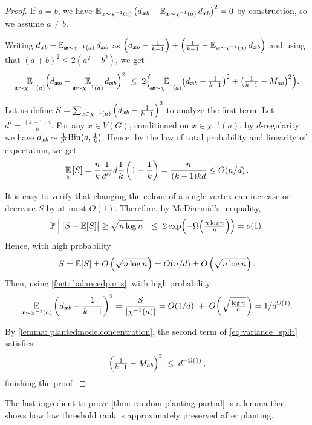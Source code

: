 \begin{proof}
    If $a=b$, we have $\operatorname*{\mathbb{E}}_{\bm{x} \sim \chi^{-1}(a)} \left(d_{\bm{x}b} - \operatorname*{\mathbb{E}}_{\bm{x} \sim \chi^{-1}(a)} d_{\bm{x}b}\right)^2 = 0$ by construction, so we assume $a\neq b$.
    
    Writing $d_{\bm{x}b} - \operatorname*{\mathbb{E}}_{\bm{x} \sim \chi^{-1}(a)} d_{\bm{x}b}$ as $\left(d_{\bm{x}b} - \frac1{k-1}\right) + \left(\frac1{k-1} - \operatorname*{\mathbb{E}}_{\bm{x} \sim \chi^{-1}(a)} d_{\bm{x}b}\right)$ and using that $(a+b)^2\leq 2(a^2+b^2)$, we get
    \begin{equation}\label{eq:variance_split}
        \E_{\bm{x} \sim \chi^{-1}(a)} \Bigl(\D{\bm{x}}{b} - \E_{\bm{x} \sim \chi^{-1}(a)} \D{\bm{x}}{b}\Bigr)^2
        \;\le\;
        2\Bigl(\E_{\bm{x} \sim \chi^{-1}(a)} \bigl(\D{\bm{x}}{b} - \tfrac1{k-1}\bigr)^2
        +\bigl(\tfrac1{k-1}-M_{ab}\bigr)^2\Bigr).
    \end{equation}

    Let us define $S=\sum_{x \in \chi^{-1}(a)} \left(d_{xb} - \frac1{k-1}\right)^2$ to analyze the first term. 
    Let $d' = \frac{(k-1)d}{k}$.
    For any $x\in V(G)$, conditioned on $x\in \chi^{-1}(a)$, by $d$-regularity we have $d_{xb}\sim \frac1{d'}\mathrm{Bin}(d, \frac1{k})$.
    Hence, by the law of total probability and linearity of expectation, we get
    $$\operatorname*{\mathbb{E}}_{\chi}\left[S\right]=\frac{n}{k}\frac1{d'^2}d\frac1{k}\left(1-\frac1{k}\right)=\frac{n}{(k-1)kd} \leq O(n/d)\,.$$ 

    It is easy to verify that changing the colour of a single vertex can increase or decrease $S$ by at most $O(1)$. Therefore, by McDiarmid's inequality,
    \[
    \operatorname*{\mathbb{P}}\left[\,\bigl|S-\operatorname*{\mathbb{E}}[S]\bigr|\ge \sqrt{n\log n}\right]
    \;\le\;
    2\exp\!\left(-\Omega\!\left(\tfrac{n\log n}{n}\right)\right)
    =o(1).
    \]
    Hence, with high probability
    \[
    S = \operatorname*{\mathbb{E}}[S]\pm O\left(\sqrt{n\log n}\right)
    = O(n/d) \pm O\left(\sqrt{n\log n}\right).
    \]
    Then, using \cref{fact: balancedparts}, with high probability
    \[\operatorname*{\mathbb{E}}_{\bm{x} \sim \chi^{-1}(a)} \left(d_{\bm{x}b} - \frac1{k-1}\right)^2
    =\frac{S}{|\chi^{-1}(a)|}
    =O\!\left(1/d\right)\;+\;O\!\left(\sqrt{\tfrac{\log n}{n}}\right)
    = 1/d^{\Omega(1)}.
    \]
    
    By \cref{lemma: plantedmodelconcentration}, the second term of \cref{eq:variance_split} satisfies
    \[
    \left(\tfrac1{k-1}-M_{ab}\right)^2
    \;\le\; d^{-\Omega(1)}\,,
    \]
    finishing the proof.
\end{proof}

The last ingredient to prove \cref{thm: random-planting-partial} is a lemma that shows how low threshold rank is approximately preserved after planting.

